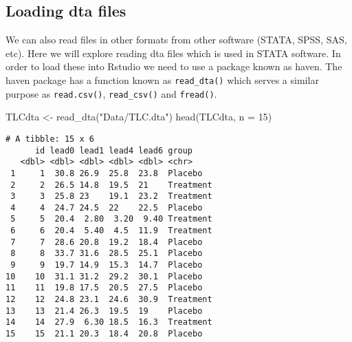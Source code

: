 \documentclass[
  letterpaper,
  DIV=11,
  numbers=noendperiod]{scrreprt}
\newenvironment{Shaded}{\begin{snugshade}}{\end{snugshade}}
\newcommand{\AttributeTok}[1]{\textcolor[rgb]{0.40,0.45,0.13}{#1}}
\newcommand{\DecValTok}[1]{\textcolor[rgb]{0.68,0.00,0.00}{#1}}
\newcommand{\FunctionTok}[1]{\textcolor[rgb]{0.28,0.35,0.67}{#1}}
\newcommand{\NormalTok}[1]{\textcolor[rgb]{0.00,0.23,0.31}{#1}}
\newcommand{\OtherTok}[1]{\textcolor[rgb]{0.00,0.23,0.31}{#1}}
\newcommand{\StringTok}[1]{\textcolor[rgb]{0.13,0.47,0.30}{#1}}
\begin{document}
\hypertarget{loading-dta-files}{%
\subsection{Loading dta files}\label{loading-dta-files}}

We can also read files in other formats from other software (STATA,
SPSS, SAS, etc). Here we will explore reading dta files which is used in
STATA software. In order to load these into Rstudio we need to use a
package known as haven. The haven package has a function known as
\texttt{read\_dta()} which serves a similar purpose as
\texttt{read.csv()}, \texttt{read\_csv()} and \texttt{fread()}.

\begin{Shaded}
\begin{Highlighting}[]
\NormalTok{TLCdta }\OtherTok{\textless{}{-}} \FunctionTok{read\_dta}\NormalTok{(}\StringTok{"Data/TLC.dta"}\NormalTok{)}
\FunctionTok{head}\NormalTok{(TLCdta, }\AttributeTok{n =} \DecValTok{15}\NormalTok{)}
\end{Highlighting}
\end{Shaded}

\begin{verbatim}
# A tibble: 15 x 6
      id lead0 lead1 lead4 lead6 group    
   <dbl> <dbl> <dbl> <dbl> <dbl> <chr>    
 1     1  30.8 26.9  25.8  23.8  Placebo  
 2     2  26.5 14.8  19.5  21    Treatment
 3     3  25.8 23    19.1  23.2  Treatment
 4     4  24.7 24.5  22    22.5  Placebo  
 5     5  20.4  2.80  3.20  9.40 Treatment
 6     6  20.4  5.40  4.5  11.9  Treatment
 7     7  28.6 20.8  19.2  18.4  Placebo  
 8     8  33.7 31.6  28.5  25.1  Placebo  
 9     9  19.7 14.9  15.3  14.7  Placebo  
10    10  31.1 31.2  29.2  30.1  Placebo  
11    11  19.8 17.5  20.5  27.5  Placebo  
12    12  24.8 23.1  24.6  30.9  Treatment
13    13  21.4 26.3  19.5  19    Placebo  
14    14  27.9  6.30 18.5  16.3  Treatment
15    15  21.1 20.3  18.4  20.8  Placebo  
\end{verbatim}



\printindex
\end{document}
